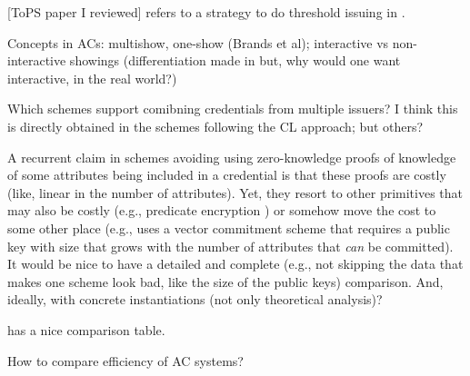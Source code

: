 [ToPS paper I reviewed] refers to a strategy to do threshold issuing in \cite{bbh06}.

Concepts in ACs: multishow, one-show (Brands et al); interactive vs non-interactive
showings (differentiation made in \cite[p.6]{fhs19} but, why would one want interactive,
in the real world?)

Which schemes support comibning credentials from multiple issuers? I think this
is directly obtained in the schemes following the CL approach; but others?

A recurrent claim in schemes avoiding using zero-knowledge proofs of knowledge
of some attributes being included in a credential is that these proofs are costly
(like, linear in the number of attributes). Yet, they resort to other primitives
that may also be costly (e.g., predicate encryption \cite{dmm+18}) or somehow move
the cost to some other place (e.g., \cite{fhs19} uses a vector commitment scheme
that requires a public key with size that grows with the number of attributes
that \emph{can} be committed). It would be nice to have a detailed and complete
(e.g., not skipping the data that makes one scheme look bad, like the size of
the public keys) comparison. And, ideally, with concrete instantiations (not only
theoretical analysis)?

\cite{fhs19} has a nice comparison table.

How to compare efficiency of AC systems?


